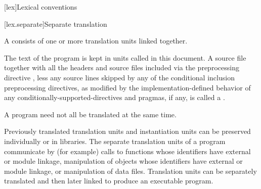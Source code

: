 [lex]{Lexical conventions}



[lex.separate]{Separate translation}

\pnum
{}%
A  consists of one or more translation units
linked together.

\pnum
{}%
%
The text of the program is kept in units called
 in this document.
A source file together with all the headers
and source files included via the preprocessing
directive , less any source lines skipped by any of the
conditional inclusion preprocessing directives,
as modified by the implementation-defined behavior of any
conditionally-supported-directives and pragmas,
if any, is
called a .
\begin{note}
A \Cpp{} program need not all be translated at the same time.
\end{note}

\pnum
\begin{note}
Previously translated translation units and instantiation
units can be preserved individually or in libraries. The separate
translation units of a program communicate by (for
example)
calls to functions whose identifiers have external or module linkage,
manipulation of objects whose identifiers have external or module linkage, or
manipulation of data files. Translation units can be separately
translated and then later linked to produce an executable
program.
\end{note}

